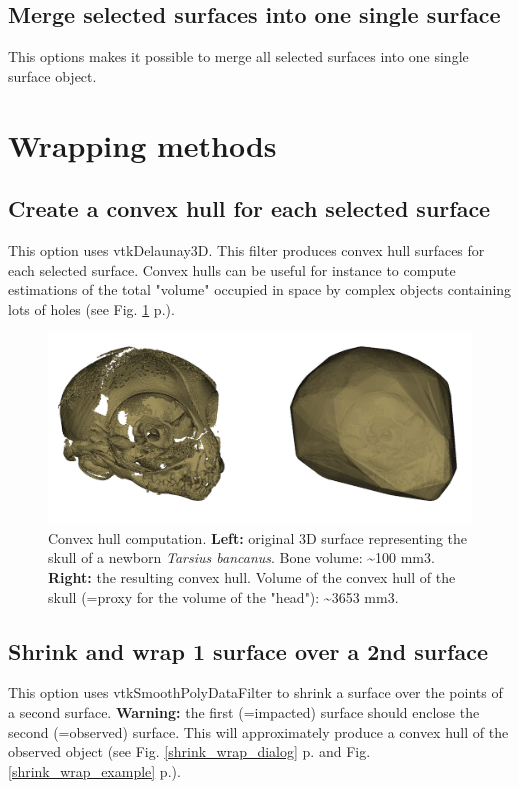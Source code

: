 \subsection{Merge selected surfaces into one single surface}
This options makes it possible to merge all selected surfaces into one single surface object. 


\section{Wrapping methods}
\subsection{Create a convex hull for each selected surface}
This option uses vtkDelaunay3D. This filter produces convex hull surfaces for each selected surface. Convex hulls can be useful for instance to compute estimations of the total "volume" occupied in space by complex objects containing lots of holes (see Fig. \ref{convex_hull} p.\pageref{convex_hull}). 

\begin{figure}
  \centering
  \includegraphics[scale=0.27]{images/09/wrapping_methods/convex_hull.png} 
	\caption{Convex hull computation. \textbf{Left:} original 3D surface representing the skull of a newborn \textit{Tarsius bancanus}. Bone volume: \textasciitilde100 mm3. \textbf{Right:} the resulting convex hull. Volume of the convex hull of the skull (=proxy for the volume of the "head"): \textasciitilde3653 mm3.}
\label{convex_hull}
 
\end{figure}

\subsection{Shrink and wrap 1 surface over a 2nd surface}
This option uses vtkSmoothPolyDataFilter to shrink a surface over the points of a second surface. \textbf{Warning:} the first (=impacted) surface should enclose the second (=observed) surface. This will approximately produce a convex hull of the observed object (see Fig. \ref{shrink_wrap_dialog} p.\pageref{shrink_wrap_dialog} and Fig. \ref{shrink_wrap_example} p.\pageref{shrink_wrap_example}). 

